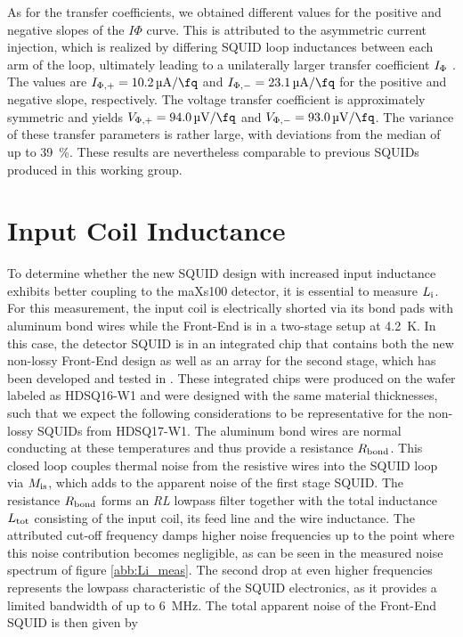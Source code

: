 As for the transfer coefficients, we obtained different values for the positive and negative slopes of the $I\Phi$ curve. This is attributed to the asymmetric current injection, which is realized by differing SQUID loop inductances between each arm of the loop, ultimately leading to a unilaterally larger transfer coefficient $I_{\rm \Phi}$ \cite{Ferring2015}. The values are $I_{\rm \Phi,+}=\qty{10.2}{\micro\ampere\per\fq}$ and $I_{\rm \Phi,-}=\qty{23.1}{\micro\ampere\per\fq}$ for the positive and negative slope, respectively. The voltage transfer coefficient is approximately symmetric and yields $V_{\rm \Phi,+}=\qty{94.0}{\micro\volt\per\fq}$ and $V_{\rm \Phi,-}=\qty{93.0}{\micro\volt\per\fq}$. The variance of these transfer parameters is rather large, with deviations from the median of up to \qty{39}{\percent}. These results are nevertheless comparable to previous SQUIDs produced in this working group.      




\section{Input Coil Inductance} \label{subsec_Li}

To determine whether the new SQUID design with increased input inductance exhibits better coupling to the maXs100 detector, it is essential to measure $L_{\rm i}$. For this measurement, the input coil is electrically shorted via its bond pads with aluminum bond wires while the Front-End is in a two-stage setup at \qty{4.2}{\kelvin}. In this case, the detector SQUID is in an integrated chip that contains both the new non-lossy Front-End design as well as an array for the second stage, which has been developed and tested in \cite{Kraemer2023}. These integrated chips were produced on the wafer labeled as HDSQ16-W1 and were designed with the same material thicknesses, such that we expect the following considerations to be representative for the non-lossy SQUIDs from HDSQ17-W1. The aluminum bond wires are normal conducting at these temperatures and thus provide a resistance $R_{\rm bond}$. This closed loop couples thermal noise from the resistive wires into the SQUID loop via $M_{\rm is}$, which adds to the apparent noise of the first stage SQUID. The resistance $R_{\rm bond}$ forms an \textit{RL} lowpass filter together with the total inductance $L_{\rm tot}$ consisting of the input coil, its feed line and the wire inductance. The attributed cut-off frequency damps higher noise frequencies up to the point where this noise contribution becomes negligible, as can be seen in the measured noise spectrum of figure \ref{abb:Li_meas}. The second drop at even higher frequencies represents the lowpass characteristic of the SQUID electronics, as it provides a limited bandwidth of up to \qty{6}{\MHz}. The total apparent noise of the Front-End SQUID is then given by     

